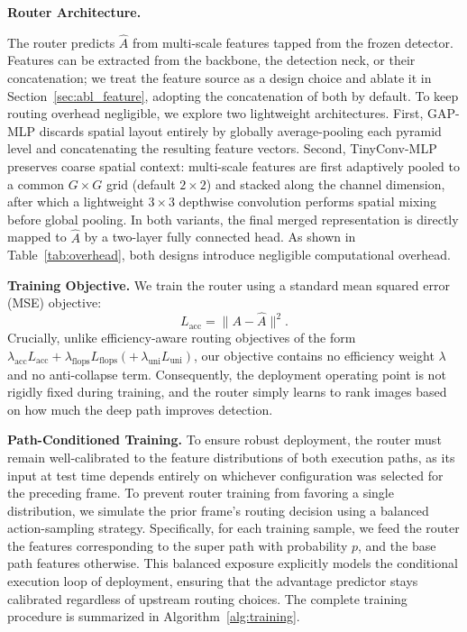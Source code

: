 \medskip
\noindent\textbf{Router Architecture.}

The router predicts $\hat{A}$ from multi-scale features tapped from the frozen detector. 
Features can be extracted from the backbone, the detection neck, or their concatenation; we treat the feature source as a design choice and ablate it in Section~\ref{sec:abl_feature}, adopting the concatenation of both by default.
To keep routing overhead negligible, we explore two lightweight architectures. 
First, GAP-MLP discards spatial layout entirely by globally average-pooling each pyramid level and concatenating the resulting feature vectors. 
Second, TinyConv-MLP preserves coarse spatial context: multi-scale features are first adaptively pooled to a common $G\times G$ grid (default $2\times2$) and stacked along the channel dimension, after which a lightweight $3\times3$ depthwise convolution performs spatial mixing before global pooling. 
In both variants, the final merged representation is directly mapped to $\hat{A}$ by a two-layer fully connected head. 
As shown in Table~\ref{tab:overhead}, both designs introduce negligible computational overhead.



\medskip
\noindent\textbf{Training Objective.}
We train the router using a standard mean squared error (MSE) objective:
\begin{equation}
L_{\text{acc}} = \| A - \hat{A} \|^2.
\label{eq:loss}
\end{equation}
Crucially, unlike efficiency-aware routing objectives of the form
$\lambda_{\text{acc}}L_{\text{acc}} + \lambda_{\text{flops}}L_{\text{flops}}
(+\,\lambda_{\text{uni}}L_{\text{uni}})$, our objective contains no efficiency
weight $\lambda$ and no anti-collapse term. 
Consequently, the deployment operating point is not rigidly fixed during training, and the router simply learns to rank images based on how much the deep path improves detection.


\medskip
\noindent\textbf{Path-Conditioned Training.}
To ensure robust deployment, the router must remain well-calibrated to the feature distributions of both execution paths, as its input at test time depends entirely on whichever configuration was selected for the preceding frame. 
To prevent router training from favoring a single distribution, we simulate the prior frame's routing decision using a balanced action-sampling strategy. 
Specifically, for each training sample, we feed the router the features corresponding to the super path with probability $p$, and the base path features otherwise. 
This balanced exposure explicitly models the conditional execution loop of deployment, ensuring that the advantage predictor stays calibrated regardless of upstream routing choices.
The complete training procedure is summarized in Algorithm~\ref{alg:training}.



